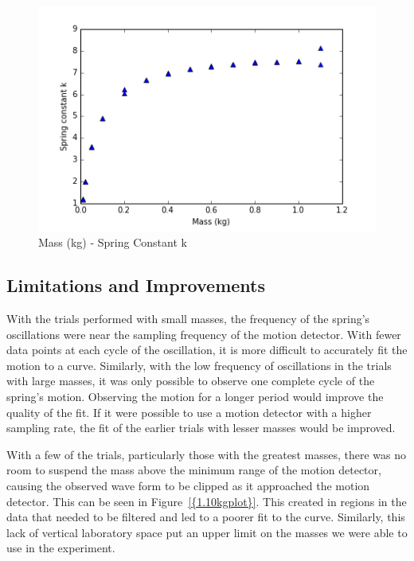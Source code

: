 \documentclass{article}
\numberwithin{figure}{section}
\numberwithin{table}{section}
\begin{document}
\begin{figure}[!hbp]
    \centering
    \includegraphics[width=\textwidth]{data/mass-v-k.png}
    \caption{Mass (kg) - Spring Constant k} 
    \label{mkplot}
\end{figure} 

\subsection{Limitations and Improvements} 
\label{limits}

With the trials performed with small masses, the frequency of the spring's oscillations were near the sampling frequency of the motion detector.  With fewer data points at each cycle of the oscillation, it is more difficult to accurately fit the motion to a curve.  Similarly, with the low frequency of oscillations in the trials with large masses, it was only possible to observe one complete cycle of the spring's motion.  Observing the motion for a longer period would improve the quality of the fit.  If it were possible to use a motion detector with a higher sampling rate, the fit of the earlier trials with lesser masses would be improved. 

With a few of the trials, particularly those with the greatest masses, there was no room to suspend the mass above the minimum range of the motion detector, causing the observed wave form to be clipped as it approached the motion detector.  This can be seen in Figure~\ref{{1.10kgplot}}.  This created in regions in the data that needed to be filtered and led to a poorer fit to the curve.  Similarly, this lack of vertical laboratory space put an upper limit on the masses we were able to use in the experiment.
\end{document}
